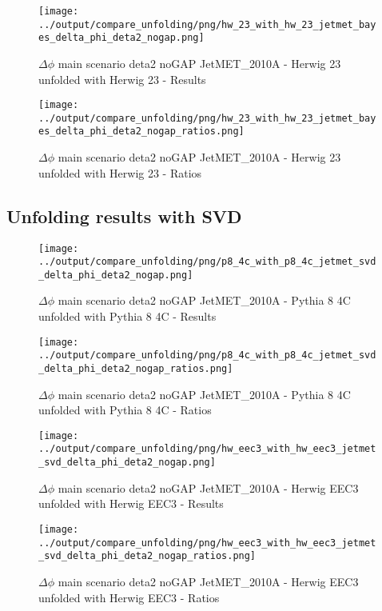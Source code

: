 \documentclass[11pt]{book}
\begin{document}
\begin{figure}[ht]
\centering
\texttt{[image: ../output/compare\_unfolding/png/hw\_23\_with\_hw\_23\_jetmet\_bayes\_delta\_phi\_deta2\_nogap.png]}
\caption{$\Delta\phi$ main scenario deta2 noGAP JetMET\_2010A - Herwig 23 unfolded with Herwig 23 - Results}
\label{hw_23_hw_23_jetmet_bayes_delta_phi_deta2_nogap_a}
\end{figure}

\begin{figure}[ht]
\centering
\texttt{[image: ../output/compare\_unfolding/png/hw\_23\_with\_hw\_23\_jetmet\_bayes\_delta\_phi\_deta2\_nogap\_ratios.png]}
\caption{$\Delta\phi$ main scenario deta2 noGAP JetMET\_2010A - Herwig 23 unfolded with Herwig 23 - Ratios}
\label{hw_23_hw_23_jetmet_bayes_delta_phi_deta2_nogap_b}
\end{figure}


\clearpage
\subsection{Unfolding results with SVD}

\begin{figure}[ht]
\centering
\texttt{[image: ../output/compare\_unfolding/png/p8\_4c\_with\_p8\_4c\_jetmet\_svd\_delta\_phi\_deta2\_nogap.png]}
\caption{$\Delta\phi$ main scenario deta2 noGAP JetMET\_2010A - Pythia 8 4C unfolded with Pythia 8 4C - Results}
\label{p8_p8_jetmet_svd_delta_phi_deta2_nogap_a}
\end{figure}

\begin{figure}[ht]
\centering
\texttt{[image: ../output/compare\_unfolding/png/p8\_4c\_with\_p8\_4c\_jetmet\_svd\_delta\_phi\_deta2\_nogap\_ratios.png]}
\caption{$\Delta\phi$ main scenario deta2 noGAP JetMET\_2010A - Pythia 8 4C unfolded with Pythia 8 4C - Ratios}
\label{p8_p8_jetmet_svd_delta_phi_deta2_nogap_b}
\end{figure}

\begin{figure}[ht]
\centering
\texttt{[image: ../output/compare\_unfolding/png/hw\_eec3\_with\_hw\_eec3\_jetmet\_svd\_delta\_phi\_deta2\_nogap.png]}
\caption{$\Delta\phi$ main scenario deta2 noGAP JetMET\_2010A - Herwig EEC3 unfolded with Herwig EEC3 - Results}
\label{hw_eec3_hw_eec3_jetmet_svd_delta_phi_deta2_nogap_a}
\end{figure}

\begin{figure}[ht]
\centering
\texttt{[image: ../output/compare\_unfolding/png/hw\_eec3\_with\_hw\_eec3\_jetmet\_svd\_delta\_phi\_deta2\_nogap\_ratios.png]}
\caption{$\Delta\phi$ main scenario deta2 noGAP JetMET\_2010A - Herwig EEC3 unfolded with Herwig EEC3 - Ratios}
\label{hw_eec3_hw_eec3_jetmet_svd_delta_phi_deta2_nogap_b}
\end{figure}
\end{document}
